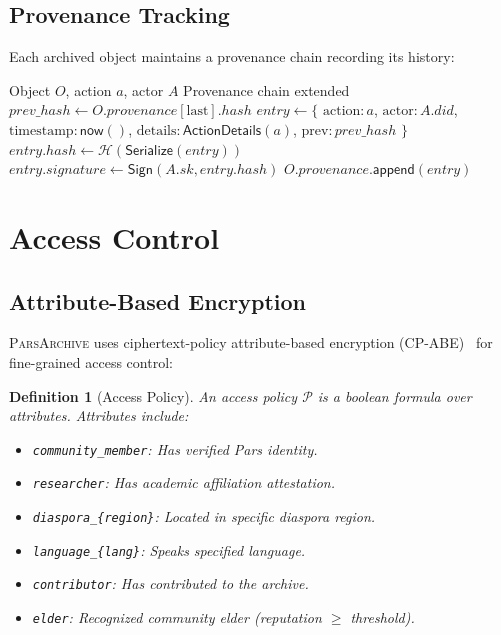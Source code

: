 \documentclass[11pt,a4paper]{article}
\newcommand{\parsarch}{\textsc{ParsArchive}\xspace}
\newcommand{\HH}{\mathcal{H}}
\newtheorem{definition}{Definition}
\begin{document}
\subsection{Provenance Tracking}

Each archived object maintains a provenance chain recording its history:

\begin{algorithm}[H]
\caption{Provenance Chain Update}
\label{alg:provenance}
\begin{algorithmic}[1]
\Require Object $O$, action $a$, actor $A$
\Ensure Provenance chain extended
\State $\mathit{prev\_hash} \leftarrow O.\mathit{provenance}[\text{last}].\mathit{hash}$
\State $\mathit{entry} \leftarrow \{$
\State \quad $\text{action}: a$, 
\State \quad $\text{actor}: A.\mathit{did}$,
\State \quad $\text{timestamp}: \mathsf{now}()$,
\State \quad $\text{details}: \mathsf{ActionDetails}(a)$,
\State \quad $\text{prev}: \mathit{prev\_hash}$
\State $\}$
\State $\mathit{entry}.\mathit{hash} \leftarrow \HH(\mathsf{Serialize}(\mathit{entry}))$
\State $\mathit{entry}.\mathit{signature} \leftarrow \mathsf{Sign}(A.\mathit{sk}, \mathit{entry}.\mathit{hash})$
\State $O.\mathit{provenance}.\mathsf{append}(\mathit{entry})$
\end{algorithmic}
\end{algorithm}

\section{Access Control}
\label{sec:access}

\subsection{Attribute-Based Encryption}

\parsarch uses ciphertext-policy attribute-based encryption (CP-ABE)~\citep{bethencourt2007ciphertext} for fine-grained access control:

\begin{definition}[Access Policy]
An access policy $\mathcal{P}$ is a boolean formula over attributes. Attributes include:
\begin{itemize}
    \item \texttt{community\_member}: Has verified Pars identity.
    \item \texttt{researcher}: Has academic affiliation attestation.
    \item \texttt{diaspora\_\{region\}}: Located in specific diaspora region.
    \item \texttt{language\_\{lang\}}: Speaks specified language.
    \item \texttt{contributor}: Has contributed to the archive.
    \item \texttt{elder}: Recognized community elder (reputation $\geq$ threshold).
\end{itemize}
\end{definition}
\end{document}
